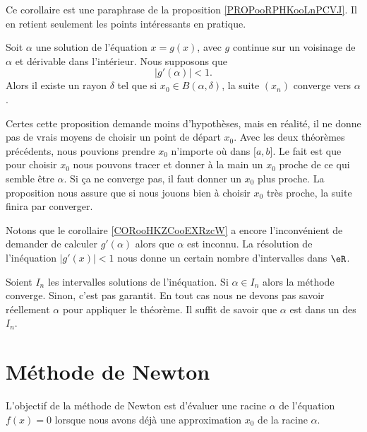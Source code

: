 Ce corollaire est une paraphrase de la proposition \ref{PROPooRPHKooLnPCVJ}. Il en retient seulement les points intéressants en pratique.

\begin{corollary}     \label{CORooHKZCooEXRzcW}
    Soit \( \alpha\) une solution de l'équation \( x=g(x)\), avec \( g\) continue sur un voisinage de \( \alpha\) et dérivable dans l'intérieur. Nous supposons que
    \begin{equation}
        | g'(\alpha) |<1.
    \end{equation}
    Alors il existe un rayon \( \delta\) tel que si \( x_0\in B(\alpha,\delta)\), la suite \( (x_n)\) converge vers \( \alpha\).
\end{corollary}
 
Certes cette proposition demande moins d'hypothèses, mais en réalité, il ne donne pas de vrais moyens de choisir un point de départ \( x_0\). Avec les deux théorèmes précédents, nous pouvions prendre \( x_0\) n'importe où dans \( \mathopen[ a , b \mathclose]\). Le fait est que pour choisir \( x_0\) nous pouvons tracer et donner à la main un \( x_0\) proche de ce qui semble être \( \alpha\). Si ça ne converge pas, il faut donner un \(x_0\) plus proche. La proposition nous assure que si nous jouons bien à choisir \( x_0\) très proche, la suite finira par converger.

Notons que le corollaire \ref{CORooHKZCooEXRzcW} a encore l'inconvénient de demander de calculer \( g'(\alpha)\) alors que \( \alpha\) est inconnu. La résolution de l'inéquation \( | g'(x) |<1\) nous donne un certain nombre d'intervalles dans \( \eR\). 

Soient \( I_n\) les intervalles solutions de l'inéquation.  Si \( \alpha\in I_n\) alors la méthode converge. Sinon, c'est pas garantit. En tout cas nous ne devons pas savoir réellement \( \alpha\) pour appliquer le théorème. Il suffit de savoir que \( \alpha\) est dans un des \( I_n\).

\section{Méthode de Newton}
\label{SECooIKXNooACLljs}

L'objectif de la méthode de Newton est d'évaluer une racine \( \alpha\) de l'équation \( f(x)=0\) lorsque nous avons déjà une approximation \( x_0\) de la racine \( \alpha\).

